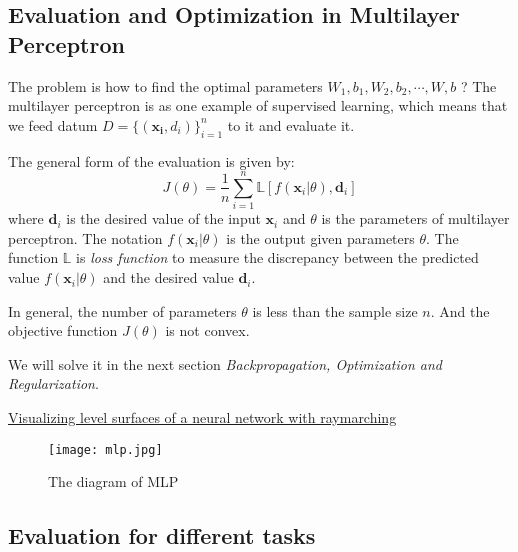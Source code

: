 \documentclass[titlestyle=hang,11pt]{elegantbook}
\begin{document}
\subsection{Evaluation and Optimization in Multilayer Perceptron}

The problem is how to find the optimal parameters $W_1, b_1, W_2, b_2,\cdots, W, b$ ?
The multilayer perceptron is as one example of supervised learning, which means that we feed datum
$ D=\{(\mathbf{x_i},d_i)\}_{i=1}^{n}$ to it and evaluate it.

The general form of the evaluation is given by:
$$ J(\theta)=\frac{1}{n}\sum_{i=1}^{n}\mathbb{L}[f(\mathbf{x}_i|\theta),\mathbf{d}_i]$$
where $\mathbf{d}_i$ is the desired value of the input $\mathbf{x}_i$ and $\theta$ is the parameters of multilayer perceptron. 
The notation $f(\mathbf{x}_i|\theta)$ is the output given parameters $\theta$. 
The function $\mathbb{L}$ is \emph{loss function} to measure the discrepancy between the predicted value $f(\mathbf{x}_i|\theta)$ and the desired value $\mathbf{d}_i$.

In general, the number of parameters $\theta$ is less than the sample size $n$. And the objective function $J(\theta)$ is not convex.  

We will solve it in the next section \emph{Backpropagation, Optimization and Regularization}.


\href{https://arogozhnikov.github.io/3d_nn/}{Visualizing level surfaces of a neural network with raymarching}

\begin{figure}[!htbp]
	\centering
	\texttt{[image: mlp.jpg]}
	\caption{The diagram of MLP\label{fig:MLP}}
\end{figure}


%


\subsection{Evaluation for different tasks}
\end{document}
